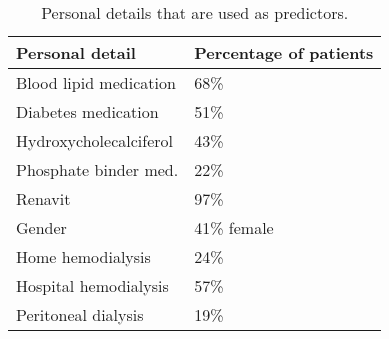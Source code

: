 \documentclass[border=1mm, preview]{standalone}
\begin{document}
\begin{table}[H]

\caption{\label{tab:table2}Personal details that are used as predictors.}
\centering
\begin{tabu} to 
\toprule
\textbf{Personal detail} & \textbf{Percentage of patients}\\
\midrule
Blood lipid medication & 68\%\\
Diabetes medication & 51\%\\
Hydroxycholecalciferol & 43\%\\
Phosphate binder med. & 22\%\\
Renavit & 97\%\\
\addlinespace
Gender & 41\% female\\
Home hemodialysis & 24\%\\
Hospital hemodialysis & 57\%\\
Peritoneal dialysis & 19\%\\
\bottomrule
\end{tabu}
\end{table}
\end{document}
